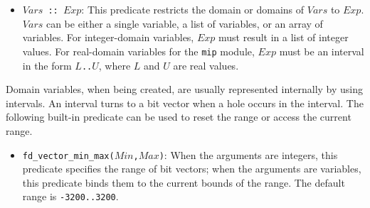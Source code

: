 \begin{itemize}
\item \texttt{$Vars$ :: $Exp$}: This predicate restricts the domain or domains of $Vars$ to $Exp$.  $Vars$ can be either a single variable, a list of variables, or an array of variables. For integer-domain variables, $Exp$ must result in a list of integer values. For real-domain variables for the {\tt mip} module, $Exp$ must be an interval in the form \texttt{$L$..$U$}, where $L$ and $U$ are real values.
\end{itemize}

Domain variables, when being created, are usually represented internally by using intervals. An
interval turns to a bit vector when a hole occurs in the interval. The following built-in predicate can be used to reset the range or access the current range.
\begin{itemize}
\item \texttt{fd\_vector\_min\_max($Min$,$Max$)}: When the arguments are integers, this predicate specifies the range of bit vectors; when the arguments are variables, this predicate binds them to the current bounds of the range. The default range is {\tt -3200..3200}.
\end{itemize}

